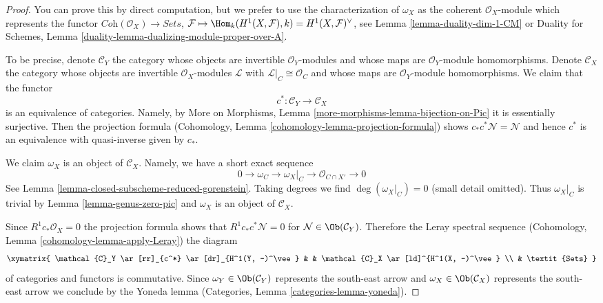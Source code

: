 \begin{proof}
You can prove this by direct computation, but we prefer to use the
characterization of $\omega_X$ as the coherent $\mathcal{O}_X$-module
which represents the functor
$\textit{Coh}(\mathcal{O}_X) \to \textit{Sets}$,
$\mathcal{F} \mapsto \Hom_k(H^1(X, \mathcal{F}), k) =
H^1(X, \mathcal{F})^\vee$, see
Lemma \ref{lemma-duality-dim-1-CM} or
Duality for Schemes, Lemma
\ref{duality-lemma-dualizing-module-proper-over-A}.

\medskip\noindent
To be precise, denote $\mathcal{C}_Y$ the category whose objects are
invertible $\mathcal{O}_Y$-modules and whose maps are
$\mathcal{O}_Y$-module homomorphisms. Denote $\mathcal{C}_X$ the category
whose objects are invertible $\mathcal{O}_X$-modules $\mathcal{L}$ with
$\mathcal{L}|_C \cong \mathcal{O}_C$ and whose maps are
$\mathcal{O}_Y$-module homomorphisms. We claim that the functor
$$
c^* : \mathcal{C}_Y \to \mathcal{C}_X
$$
is an equivalence of categories. Namely, by
More on Morphisms, Lemma \ref{more-morphisms-lemma-bijection-on-Pic}
it is essentially surjective. Then the projection formula
(Cohomology, Lemma \ref{cohomology-lemma-projection-formula})
shows $c_*c^*\mathcal{N} = \mathcal{N}$ and hence $c^*$
is an equivalence with quasi-inverse given by $c_*$.

\medskip\noindent
We claim $\omega_X$ is an object of $\mathcal{C}_X$. Namely, we have a
short exact sequence
$$
0 \to \omega_C \to \omega_X|_C \to \mathcal{O}_{C \cap X'} \to 0
$$
See Lemma \ref{lemma-closed-subscheme-reduced-gorenstein}.
Taking degrees we find $\deg(\omega_X|_C) = 0$ (small detail omitted).
Thus $\omega_X|_C$ is trivial by Lemma \ref{lemma-genus-zero-pic}
and $\omega_X$ is an object of $\mathcal{C}_X$.

\medskip\noindent
Since $R^1c_*\mathcal{O}_X = 0$ the projection formula shows that
$R^1c_*c^*\mathcal{N} = 0$ for $\mathcal{N} \in \Ob(\mathcal{C}_Y)$.
Therefore the Leray spectral sequence
(Cohomology, Lemma \ref{cohomology-lemma-apply-Leray})
the diagram
$$
\xymatrix{
\mathcal{C}_Y \ar[rr]_{c^*} \ar[dr]_{H^1(Y, -)^\vee} & &
\mathcal{C}_X \ar[ld]^{H^1(X, -)^\vee} \\
& \textit{Sets}
}
$$
of categories and functors is commutative. Since
$\omega_Y \in \Ob(\mathcal{C}_Y)$ represents the south-east arrow and
$\omega_X \in \Ob(\mathcal{C}_X)$ represents the south-east arrow
we conclude by the Yoneda lemma
(Categories, Lemma \ref{categories-lemma-yoneda}).
\end{proof}

